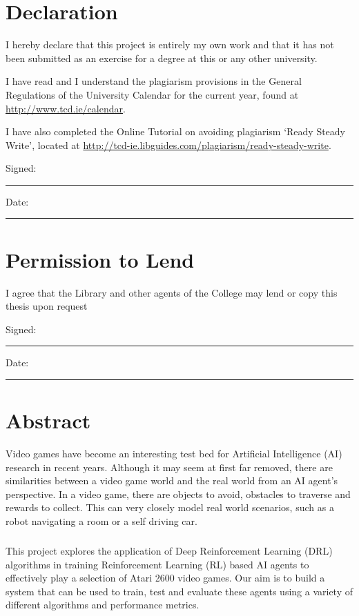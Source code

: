 \documentclass[a4paper,oneside,12pt]{book}
\title{\thesistitle}
\author{\authorname}
\begin{document}

\chapter*{Declaration}
\vspace{1cm}
I hereby declare that this project is entirely my own work and that it has not been submitted as an exercise for a degree at this or any other university.

\vspace{1cm}
I have read and I understand the plagiarism provisions in the General Regulations of the University Calendar for the current year, found at \url{http://www.tcd.ie/calendar}.
\vspace{1cm}

I have also completed the Online Tutorial on avoiding plagiarism `Ready Steady Write', located at
\url{http://tcd-ie.libguides.com/plagiarism/ready-steady-write}.
\vspace{3cm}

Signed:~\rule{5cm}{0.3pt}\hfill Date:~\rule{5cm}{0.3pt}

\chapter*{Permission to Lend}
I agree that the Library and other agents of the College may lend or copy this thesis upon
request
\vspace{3cm}

Signed:~\rule{5cm}{0.3pt}\hfill Date:~\rule{5cm}{0.3pt}

\chapter*{Abstract}
Video games have become an interesting test bed for Artificial Intelligence (AI) research in recent years. Although it may seem at first far removed, there are similarities between a video game world and the real world from an AI agent's perspective. In a video game, there are objects to avoid, obstacles to traverse and rewards to collect. This can very closely model real world scenarios, such as a robot navigating a room or a self driving car. \paragraph{}

This project explores the application of Deep Reinforcement Learning (DRL) algorithms in training Reinforcement Learning (RL) based AI agents to effectively play a selection of Atari 2600 video games. Our aim is to build a system that can be used to train, test and evaluate these agents using a variety of different algorithms and performance metrics. \paragraph{}
\end{document}
